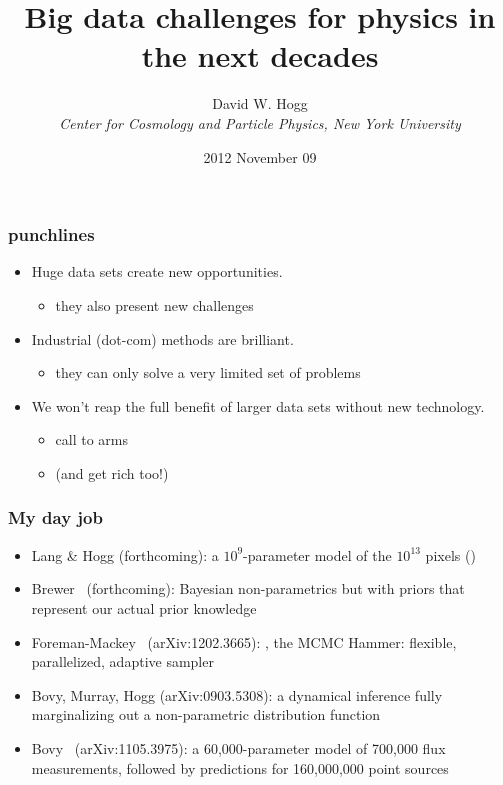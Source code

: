 \documentclass[pdftex]{beamer}
\title{Big data challenges for physics in the next decades}
\author[David W. Hogg (NYU)]{David W. Hogg \\
  \textsl{\small Center for Cosmology and Particle Physics,
                 New York University}}
\date{2012 November 09}
\newcommand{\conclusion}{
\begin{frame}
  \frametitle{punchlines}
  \begin{itemize}
  \item Huge data sets create new opportunities.
    \begin{itemize}
    \item they also present new challenges
    \end{itemize}
  \item Industrial (dot-com) methods are brilliant.
    \begin{itemize}
    \item they can only solve a very limited set of problems
    \end{itemize}
  \item We won't reap the full benefit of larger data sets without new technology.
    \begin{itemize}
    \item call to arms
    \item (and get rich too!)
    \end{itemize}
  \end{itemize}
\end{frame}
}
\begin{document}
\begin{frame}
  \titlepage
\end{frame}

\conclusion

\begin{frame}
  \frametitle{My day job}
  \begin{itemize}
  \item Lang \& Hogg {\small(forthcoming)}: a $10^9$-parameter model of the
    $10^{13}$  pixels ()
  \item Brewer \etal\ {\small(forthcoming)}: Bayesian non-parametrics but with
    priors that represent our actual prior knowledge
  \item Foreman-Mackey \etal\ {\small(arXiv:1202.3665)}:
    , the MCMC Hammer: flexible, parallelized, adaptive
    sampler
  \item Bovy, Murray, Hogg {\small(arXiv:0903.5308)}: a dynamical inference
    fully marginalizing out a non-parametric distribution function
  \item Bovy \etal\ {\small(arXiv:1105.3975)}: a 60,000-parameter model of
    700,000 flux measurements, followed by predictions for 160,000,000
    point sources
  \end{itemize}
\end{frame}
\end{document}
